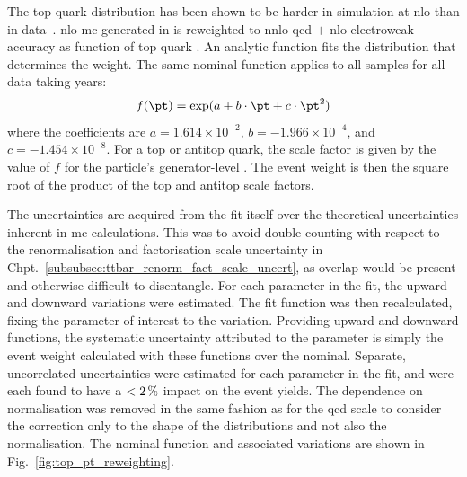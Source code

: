 The top quark \pt distribution has been shown to be harder in simulation at \acrshort{nlo} than in data~\cite{Sirunyan:2018ucr}. \acrshort{nlo} \ttbarpjets \acrshort{mc} generated in \POWHEG is reweighted to \acrshort{nnlo} \acrshort{qcd} $+$ \acrshort{nlo} electroweak accuracy as function of top quark \pt. An analytic function fits the distribution that determines the weight. The same nominal function applies to all \ttbarpjets samples for all data taking years:
\begin{equation}
    f(\pt) = \exp(a + b \cdot \pt + c \cdot \pt^2)
\end{equation}
where the coefficients are $a = \text{1.614} \times \text{10}^{-2}$, $b = -\text{1.966} \times \text{10}^{-4}$, and $c = -\text{1.454} \times \text{10}^{-8}$. For a top or antitop quark, the scale factor is given by the value of $f$ for the particle's generator-level \pt. The event weight is then the square root of the product of the top and antitop scale factors.

The uncertainties are acquired from the fit itself over the theoretical uncertainties inherent in \acrshort{mc} calculations. This was to avoid double counting with respect to the renormalisation and factorisation scale uncertainty in Chpt.~\ref{subsubsec:ttbar_renorm_fact_scale_uncert}, as overlap would be present and otherwise difficult to disentangle. For each parameter in the fit, the upward and downward variations were estimated. The fit function was then recalculated, fixing the parameter of interest to the variation. Providing upward and downward functions, the systematic uncertainty attributed to the parameter is simply the event weight calculated with these functions over the nominal. Separate, uncorrelated uncertainties were estimated for each parameter in the fit, and were each found to have a $< \text{2\,\%}$ impact on the event yields. The dependence on normalisation was removed in the same fashion as for the \acrshort{qcd} scale to consider the correction only to the shape of the distributions and not also the normalisation. The nominal function and associated variations are shown in Fig.~\ref{fig:top_pt_reweighting}.

\clearpage

